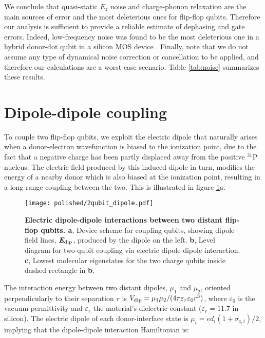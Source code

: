 We conclude that quasi-static $E_z$ noise and charge-phonon relaxation are the main sources of error and the most deleterious ones for flip-flop qubits. Therefore our analysis is sufficient to provide a reliable estimate of dephasing and gate errors. Indeed, low-frequency noise was found to be the most deleterious one in a hybrid donor-dot qubit in a silicon MOS device \cite{Harvey-Collard2017}. Finally, note that we do not assume any type of dynamical noise correction or cancellation to be applied, and therefore our calculations are a worst-case scenario. Table \ref{tab:noise} summarizes these results. 

\section{Dipole-dipole coupling} \label{sec:dd_coupling}

To couple two flip-flop qubits, we exploit the electric dipole that naturally arises when a donor-electron wavefunction is biased to the ionization point, due to the fact that a negative charge has been partly displaced away from the positive $^{31}$P nucleus. The electric field produced by this induced dipole in turn, modifies the energy of a nearby donor which is also biased at the ionization point, resulting in a long-range coupling between the two. This is illustrated in figure \ref{fig:dipole}a.

\begin{figure}[h]
	\centering
	\texttt{[image: polished/2qubit\_dipole.pdf]}
	\caption[Electric dipole-dipole interactions between two distant flip-flop qubits]{\textbf{Electric dipole-dipole interactions between two distant flip-flop qubits. a}, Device scheme for coupling qubits, showing dipole field lines, $\textit{\textbf{E}}_{\rm dip}$, produced by the dipole on the left.
		\textbf{b}, Level diagram for two-qubit coupling via electric dipole-dipole interaction.
		\textbf{c}, Lowest molecular eigenstates for the two charge qubits inside dashed rectangle in \textbf{b}.}
	\label{fig:dipole}
\end{figure}

The interaction energy between two distant dipoles, $\mu_1$ and $\mu_2$, oriented perpendicularly to their separation $r$ is $V_{\rm dip}=\mu_1\mu_2/(4\pi\varepsilon_r\varepsilon_0r^3)$, where $\varepsilon_0$ is the vacuum permittivity and $\varepsilon_r$ the material's dielectric constant ($\varepsilon_r=11.7$ in silicon)\cite{Ravets2014}. The electric dipole of each donor-interface state is $\mu_i=ed_i(1+\sigma_{z,i})/2$, implying that the dipole-dipole interaction Hamiltonian is:

